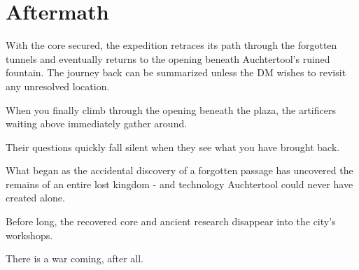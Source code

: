\section*{Aftermath}
{\entryfont With the core secured, the expedition retraces its path through the forgotten tunnels and eventually returns to the opening beneath Auchtertool's ruined fountain. The journey back can be summarized unless the DM wishes to revisit any unresolved location.}
\begin{DndReadAloud}
	When you finally climb through the opening beneath the plaza, the artificers waiting above immediately gather around.

	Their questions quickly fall silent when they see what you have brought back.

	What began as the accidental discovery of a forgotten passage has uncovered the remains of an entire lost kingdom - and technology Auchtertool could never have created alone.

	Before long, the recovered core and ancient research disappear into the city's workshops.

	There is a war coming, after all.
\end{DndReadAloud}

